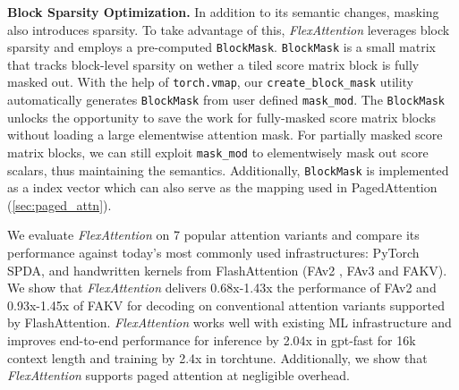 \textbf{Block Sparsity Optimization.} In addition to its semantic changes, masking also introduces sparsity.
To take advantage of this, \textit{FlexAttention} leverages block sparsity and employs a pre-computed {\tt BlockMask}.
{\tt BlockMask} is a small matrix that tracks block-level sparsity on wether a tiled score matrix block is fully masked out.
With the help of {\tt torch.vmap}, our {\tt create\_block\_mask} utility automatically generates \texttt{BlockMask} from user defined {\tt mask\_mod}.
The {\tt BlockMask} unlocks the opportunity to save the work for fully-masked score matrix blocks without loading a large elementwise attention mask. 
For partially masked score matrix blocks, we can still exploit \texttt{mask\_mod} to elementwisely mask out score scalars, thus maintaining the semantics.
Additionally, {\tt BlockMask} is implemented as a index vector which can also serve as the mapping used in PagedAttention\cite{PagedAttn} (\autoref{sec:paged_attn}).


We evaluate \textit{FlexAttention} on 7 popular attention variants and compare its performance against today's most commonly used infrastructures: PyTorch SPDA, and handwritten kernels from FlashAttention (FAv2 \cite{flashattention2}, FAv3 \cite{FA3} and FAKV\cite{flashdecoding}). We show that \textit{FlexAttention} delivers 0.68x-1.43x the performance of FAv2 and 0.93x-1.45x of FAKV for decoding on conventional attention variants supported by FlashAttention. \textit{FlexAttention} works well with existing ML infrastructure and improves end-to-end performance for inference by 2.04x in gpt-fast for 16k context length and training by 2.4x in torchtune. Additionally, we show that \textit{FlexAttention} supports paged attention at negligible overhead. 
